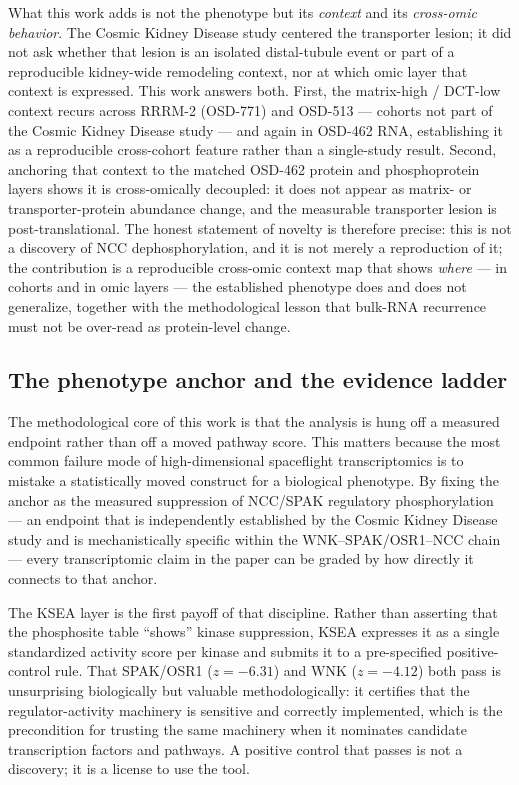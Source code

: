 \documentclass[11pt]{article}
\begin{document}
What this work adds is not the phenotype but its \emph{context} and its \emph{cross-omic behavior}. The Cosmic Kidney Disease study centered the transporter lesion; it did not ask whether that lesion is an isolated distal-tubule event or part of a reproducible kidney-wide remodeling context, nor at which omic layer that context is expressed. This work answers both. First, the matrix-high / DCT-low context recurs across RRRM-2 (OSD-771) and OSD-513 --- cohorts not part of the Cosmic Kidney Disease study --- and again in OSD-462 RNA, establishing it as a reproducible cross-cohort feature rather than a single-study result. Second, anchoring that context to the matched OSD-462 protein and phosphoprotein layers shows it is cross-omically decoupled: it does not appear as matrix- or transporter-protein abundance change, and the measurable transporter lesion is post-translational. The honest statement of novelty is therefore precise: this is not a discovery of NCC dephosphorylation, and it is not merely a reproduction of it; the contribution is a reproducible cross-omic context map that shows \emph{where} --- in cohorts and in omic layers --- the established phenotype does and does not generalize, together with the methodological lesson that bulk-RNA recurrence must not be over-read as protein-level change.

\subsection{The phenotype anchor and the evidence ladder}

The methodological core of this work is that the analysis is hung off a measured endpoint rather than off a moved pathway score. This matters because the most common failure mode of high-dimensional spaceflight transcriptomics is to mistake a statistically moved construct for a biological phenotype. By fixing the anchor as the measured suppression of NCC/SPAK regulatory phosphorylation --- an endpoint that is independently established by the Cosmic Kidney Disease study \citep{siew2024cosmic} and is mechanistically specific within the WNK--SPAK/OSR1--NCC chain --- every transcriptomic claim in the paper can be graded by how directly it connects to that anchor.

The KSEA layer is the first payoff of that discipline. Rather than asserting that the phosphosite table ``shows'' kinase suppression, KSEA expresses it as a single standardized activity score per kinase and submits it to a pre-specified positive-control rule. That SPAK/OSR1 ($z=-6.31$) and WNK ($z=-4.12$) both pass is unsurprising biologically but valuable methodologically: it certifies that the regulator-activity machinery is sensitive and correctly implemented, which is the precondition for trusting the same machinery when it nominates candidate transcription factors and pathways. A positive control that passes is not a discovery; it is a license to use the tool.
\end{document}
